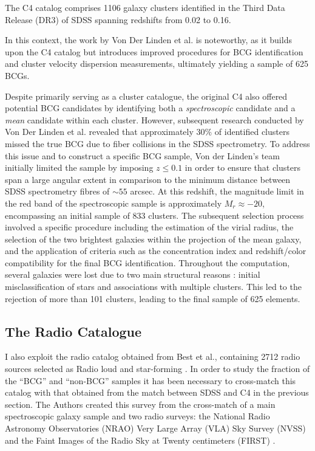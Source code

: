 The C4 catalog comprises 1106 galaxy clusters identified in the Third Data Release (DR3) of SDSS spanning redshifts from 0.02 to 0.16. 

In this context, the work by Von Der Linden et al.  \cite{2007MNRAS.379..867V} is noteworthy, as it builds upon the C4 catalog but introduces improved procedures for BCG identification and cluster velocity dispersion measurements, ultimately yielding a sample of 625 BCGs.

Despite primarily serving as a cluster catalogue, the original C4 also offered potential BCG candidates by identifying both a \textit{spectroscopic} candidate and a \textit{mean} candidate within each cluster. However, subsequent research conducted by Von Der Linden et al. revealed that approximately $30\%$ of identified clusters missed the true BCG due to fiber collisions in the SDSS spectrometry.
To address this issue and to construct a specific BCG sample, Von der Linden's team initially limited the sample by imposing $z\leq 0.1$ in order to ensure that clusters span a large angular extent in comparison to the minimum distance between SDSS spectrometry fibres of $\sim55$ arcsec. 
At this redshift, the magnitude limit in the red band of the spectroscopic sample is approximately $M_{r} \approx -20$, encompassing an initial sample of 833 clusters. The subsequent selection process involved a specific procedure including the estimation of the virial radius, the selection of the two brightest galaxies within the projection of the mean galaxy, and the application of criteria such as the concentration index and redshift/color compatibility for the final BCG identification.
Throughout the computation, several galaxies were lost due to two main structural reasons : initial misclassification of stars and associations with multiple clusters. This led to the rejection of more than 101 clusters, leading to the final sample of 625 elements.



\subsection{The Radio Catalogue}

I also exploit the radio catalog obtained from Best et al., containing 2712 radio sources selected as Radio loud and star-forming \cite{2005MNRAS.362....9B}. In order to study the fraction of the “BCG” and “non-BCG” samples it has been necessary to cross-match this catalog with that obtained from the match between SDSS and C4 in the previous section.
The Authors created this survey from the cross-match of a main spectroscopic galaxy sample and two radio surveys: the National Radio Astronomy Observatories (NRAO) Very Large Array (VLA) Sky Survey (NVSS) \cite{1998AJ....115.1693C} and the Faint Images of the Radio Sky at Twenty centimeters (FIRST) \cite{1995ApJ...450..559B}.


